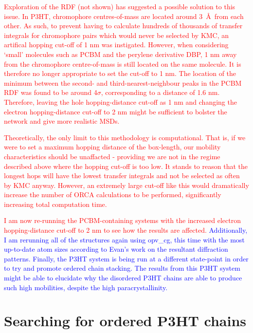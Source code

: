 \documentclass[12pt]{article}
\begin{document}
\textcolor{red}{Exploration of the RDF (not shown) has suggested a possible solution to this issue.
In P3HT, chromophore centres-of-mass are located around 3~\AA~from each other.
As such, to prevent having to calculate hundreds of thousands of transfer integrals for chromophore pairs which would never be selected by KMC, an artifical hopping cut-off of 1 nm was instigated.
However, when considering `small' molecules such as PCBM and the perylene derivative DBP, 1 nm away from the chromophore centre-of-mass is still located on the same molecule.
It is therefore no longer appropriate to set the cut-off to 1 nm.
The location of the minimum between the second- and third-nearest-neighbour peaks in the PCBM RDF was found to be around 4$\sigma$, corresponding to a distance of 1.6 nm.
Therefore, leaving the hole hopping-distance cut-off as 1 nm and changing the electron hopping-distance cut-off to 2 nm might be sufficient to bolster the network and give more realistic MSDs.}

\textcolor{red}{Theoretically, the only limit to this methodology is computational.
    That is, if we were to set a maximum hopping distance of the box-length, our mobility characteristics should be unaffacted - providing we are not in the regime described above where the hopping cut-off is too low.
    It stands to reason that the longest hops will have the lowest transfer integrals and not be selected as often by KMC anyway.
However, an extremely large cut-off like this would dramatically increase the number of ORCA calculations to be performed, significantly increasing total computation time.
}

\textcolor{red}{I am now re-running the PCBM-containing systems with the increased electron hopping-distance cut-off to 2 nm to see how the results are affected.}
\textcolor{blue}{Additionally, I am rerunning all of the structures again using opv\_cg, this time with the most up-to-date atom sizes according to Evan's work on the resultant diffraction patterns.
    Finally, the P3HT system is being run at a different state-point in order to try and promote ordered chain stacking.
The results from this P3HT system might be able to elucidate why the disordered P3HT chains are able to produce such high mobilities, despite the high paracrystallinity.}


\clearpage

\section{Searching for ordered P3HT chains}
\end{document}
